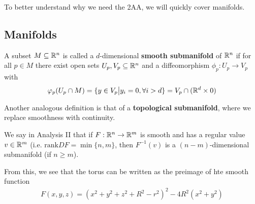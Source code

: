 To better understand why we need the 2AA, we will quickly cover manifolds.

\subsection{Manifolds}
\begin{dfn}[]
A subset $M \subseteq \mathbb{R}^{n}$ is called a $d$-dimensional \textbf{smooth submanifold} of $\mathbb{R}^{n}$ if for all $p \in M$ there exist open sets $U_p,V_p \subseteq \mathbb{R}^{n}$ and a diffeomorphism $\phi_p: U_p \to  V_p$ with
\begin{align*}
  \varphi_p(U_p \cap M) = \{y \in V_p \big\vert y_i = 0, \forall i > d\} = V_p \cap (\mathbb{R}^{d} \times 0)
\end{align*}
\end{dfn}
Another analogous definition is that of a \textbf{topological submanifold}, where we replace smoothness with continuity.

\begin{ex}[]
  We say in Analysis II that if $F: \mathbb{R}^{n} \to  \mathbb{R}^{m}$ is smooth and has a regular value $v \in \mathbb{R}^{m}$ (i.e. $\text{rank} DF = \min\{n,m\}$, then $F^{-1}(v)$ is a $(n-m)$-dimensional submanifold (if $n \geq m$).

  From this, we see that the torus can be written as the preimage of hte smooth function
  \begin{align*}
    F(x,y,z) = (x^{2} + y^{2} + z^{2} + R^{2} - r^{2})^{2} - 4R^{2}(x^{2} + y^{2})
  \end{align*}
\end{ex}



